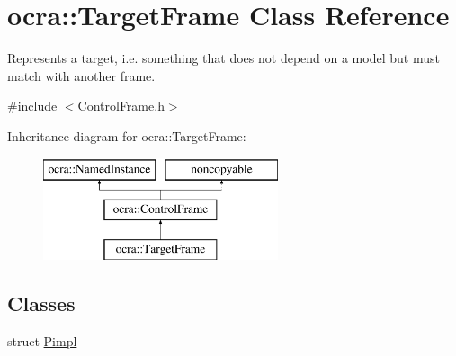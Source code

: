 \hypertarget{classocra_1_1TargetFrame}{}\section{ocra\+:\+:Target\+Frame Class Reference}
\label{classocra_1_1TargetFrame}


Represents a \textquotesingle{}target\textquotesingle{}, i.\+e. something that does not depend on a model but must match with another frame.  




{\ttfamily \#include $<$Control\+Frame.\+h$>$}

Inheritance diagram for ocra\+:\+:Target\+Frame\+:\begin{figure}[H]
\begin{center}
\leavevmode
\includegraphics[height=3.000000cm]{da/dbb/classocra_1_1TargetFrame}
\end{center}
\end{figure}
\subsection*{Classes}
\begin{DoxyCompactItemize}
\item 
struct \hyperlink{structocra_1_1TargetFrame_1_1Pimpl}{Pimpl}
\end{DoxyCompactItemize}
